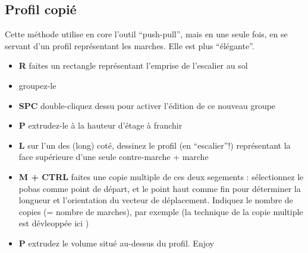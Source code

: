 \documentclass[a4paper,12pt,french]{sphinxmanual}
\begin{document}
\subsection{Profil copié}
\label{su/escalier:profil-copie}
Cette méthode utilise en core l'outil ``push-pull'', mais en une seule fois, en se servant d'un profil représentant les marches. Elle est plus ``élégante''.
\begin{itemize}
\item {} 
\textbf{R} faites un rectangle représentant l'emprise de l'escalier au sol

\item {} 
groupez-le

\item {} 
\textbf{SPC} double-cliquez dessu pour activer l'édition de ce nouveau groupe

\item {} 
\textbf{P} extrudez-le à la hauteur d'étage à franchir

\item {} 
\textbf{L} sur l'un des (long) coté, dessinez le profil (en ``escalier''!) représentant la face supérieure d'une seule contre-marche + marche

\item {} 
\textbf{M + CTRL} faites une copie multiple de ces deux segements : sélectionnez le pobas comme point de départ, et le point haut comme fin pour déterminer la longueur et l'orientation du vecteur de déplacement. Indiquez le nombre de copies (= nombre de marches), par exemple  (la technique de la copie multiple est dévleoppée ici {\hyperref[su/clonage:deplcmt\string-multipl]{}})

\item {} 
\textbf{P} extrudez le volume situé au-dessus du profil. Enjoy

\end{itemize}
\end{document}
